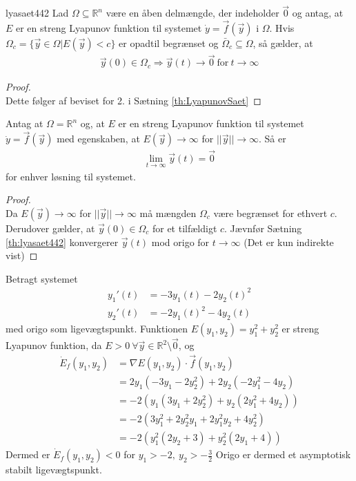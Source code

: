 \begin{koro}{}{lyasaet442} 
 Lad $\Omega \subseteq \mathbb{R}^n$ være en åben delmængde, der indeholder $\vec{0}$ og antag, at $E$ er en streng Lyapunov funktion til systemet $\dot{y}=\vec{f}(\vec{y})$ i $\Omega$. Hvis $\Omega_c=\{\vec{y}\in \Omega | E(\vec{y})<c\}$ er opadtil begrænset og $\bar{\Omega}_c\subseteq \Omega$, så gælder, at
\begin{align*}
\vec{y}(0)\in \Omega_c \Rightarrow \vec{y}(t)\to \vec{0} \ \text{for} \ t \to \infty
\end{align*}
\end{koro}
\begin{proof}\\
Dette følger af beviset for 2. i Sætning \ref{th:LyapunovSaet}
\end{proof}
\begin{koro}{}{}
Antag at $\Omega=\mathbb{R}^n$ og, at $E$ er en streng Lyapunov funktion til systemet $\dot{y}=\vec{f}(\vec{y})$ med egenskaben, at $E(\vec{y})\to \infty$ for $||\vec{y}|| \to \infty$. Så er
\begin{align*}
    \lim_{t \to \infty} \vec{y}(t)=\vec{0}
\end{align*}
for enhver løsning til systemet.
\end{koro}
\begin{proof}\\
Da $E(\vec{y})\to \infty$ for $||\vec{y}|| \to \infty$ må mængden $\Omega_c$ være begrænset for ethvert $c$. Derudover gælder, at $\vec{y}(0) \in \Omega_c$ for et tilfældigt $c$. Jævnfør Sætning \ref{th:lyasaet442} konvergerer $\vec{y}(t)$ mod origo for $t \to \infty$
(Det er kun indirekte vist)
\end{proof}

\begin{Example}
\textnormal{Betragt systemet}
\begin{align*}
    y_1'(t)&=-3y_1(t)-2y_2(t)^2 \\
    y_2'(t)&=-2y_1(t)^2-4y_2(t)
\end{align*}
\textnormal{med origo som ligevægtspunkt. Funktionen $E(y_1,y_2)=y_1^2+y_2^2$ er streng Lyapunov funktion, da $E>0 \ \forall \vec{y} \in \mathbb{R}^2\setminus \vec{0}$, og}
\begin{align*}
    \dot{E}_f(y_1,y_2)&=\nabla E(y_1,y_2)\cdot \vec{f}(y_1,y_2)\\
    &=2y_1(-3y_1-2y_2^2)+2y_2(-2y_1^2-4y_2)\\
    &=-2(y_1(3y_1+2y_2^2)+y_2(2y_1^2+4y_2))\\
    &=-2(3y_1^2+2y_2^2y_1+2y_1^2y_2+4y_2^2)\\
    &=-2(y_1^2(2y_2+3)+y_2^2(2y_1+4))
\end{align*}
\textnormal{Dermed er $\dot{E}_f(y_1,y_2)<0$ for $y_1>-2, \ y_2 > -\frac{3}{2}$ \hfill \break
Origo er dermed et asymptotisk stabilt ligevægtspunkt.}
\end{Example}

